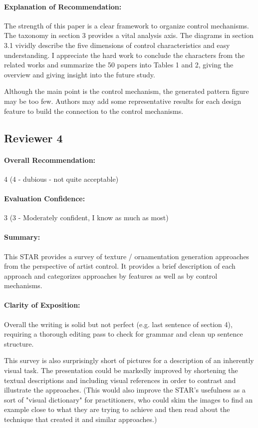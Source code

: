 \documentclass{egpubl}
\newcommand{\rev}[2]{{\color{greenrev}\textsuperscript{#1}#2}}
\renewcommand{\rev}[2]{{#2}}
\begin{document}
\paragraph*{Explanation of Recommendation:} The strength of this paper is a clear framework to organize control mechanisms. The taxonomy in section 3 provides a vital analysis axis. The diagrams in section 3.1 vividly describe the five dimensions of control characteristics and easy understanding. I appreciate the hard work to conclude the characters from the related works and summarize the 50 papers into Tables 1 and 2, giving the overview and giving insight into the future study.

Although the main point is the control mechanism, the generated pattern figure may be too few. Authors may add some representative results for each design feature to build the connection to the control mechanisms.


\rev{Comments}{}


\subsection*{Reviewer 4} 

\paragraph*{Overall Recommendation:} 4 (4 - dubious - not quite acceptable)
\paragraph*{Evaluation Confidence:} 3 (3 - Moderately confident, I know as much as most)
\paragraph*{Summary:} This STAR provides a survey of texture / ornamentation generation approaches from the perspective of artist control. It provides a brief description of each approach and categorizes approaches by features as well as by control mechanisms.
\paragraph*{Clarity of Exposition:} Overall the writing is solid but not perfect (e.g. last sentence of section 4), requiring a thorough editing pass to check for grammar and clean up sentence structure.

This survey is also surprisingly short of pictures for a description of an inherently visual task. The presentation could be markedly improved by shortening the textual descriptions and including visual references in order to contrast and illustrate the approaches. (This would also improve the STAR's usefulness as a sort of "visual dictionary" for practitioners, who could skim the images to find an example close to what they are trying to achieve and then read about the technique that created it and similar approaches.)
\end{document}
